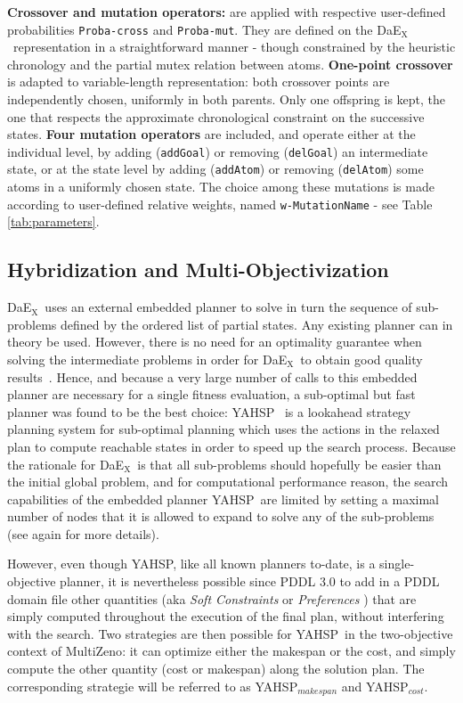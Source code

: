 \documentclass{llncs}
\def\DAEX{{\sc DaE$_{\text{X}}$}}
\def\YAHSP{{\sc YAHSP}}
\def\MULTIZENO{{\sc MultiZeno}}
\renewcommand{\paragraph}[1]{{\bf #1}}
\begin{document}
\paragraph{Crossover and mutation operators:} are applied with respective user-defined probabilities {\tt Proba-cross} and {\tt Proba-mut}. They are defined on the \DAEX\ representation in a straightforward manner - though constrained by the heuristic chronology and the partial mutex relation between atoms.
{\bf One-point crossover} is adapted to variable-length representation: both crossover points are independently chosen, uniformly in both parents. Only one offspring is kept, the one that respects the approximate chronological constraint on the successive states. 
{\bf Four mutation operators} are included, and operate either at the individual level, by adding ({\tt addGoal}) or removing ({\tt delGoal}) an intermediate state, or at the state level by adding ({\tt addAtom}) or removing ({\tt delAtom}) some atoms in a uniformly chosen state. The choice among these mutations is made according to user-defined relative weights, named {\tt w-MutationName} - see Table \ref{tab:parameters}. 


\subsection{Hybridization and Multi-Objectivization}
\label{sec:multiobjectivization}
\DAEX\ uses an external embedded planner to solve in turn the sequence of sub-problems defined by the ordered list of partial states.
Any existing planner can in theory be used. However, there is no need for an optimality guarantee when solving the intermediate problems in order for \DAEX\ to obtain good quality results~\cite{Bibai2010}. Hence, and because a very large number of calls to this embedded planner are necessary for a single fitness evaluation, a sub-optimal but fast planner was found to be the best choice: \YAHSP~\cite{Vidal2004} is a lookahead 
strategy planning system for sub-optimal planning which uses the  actions in the relaxed plan to compute reachable states in order to speed up the search process.
Because the rationale for \DAEX\ is that all sub-problems should hopefully be easier than the initial global problem, and for computational performance reason, the search capabilities of the embedded planner \YAHSP\ are limited by setting a maximal number of nodes that it is allowed to expand to solve any of the sub-problems (see again \cite{Bibai2010} for more details).
 
However, even though \YAHSP, like all known planners to-date, is a single-objective planner, it is nevertheless possible since PDDL 3.0 to add in a PDDL domain file other quantities (aka {\em Soft Constraints} or {\em Preferences} \cite{gerevini2006preferences}) that are simply computed throughout the execution of the final plan, without interfering with the search. Two strategies are then possible for \YAHSP\ in the two-objective context of \MULTIZENO: it can optimize either the makespan or the cost, and simply compute the other quantity (cost or makespan) along the solution plan. The corresponding strategie will be referred to as \YAHSP$_{makespan}$ and \YAHSP$_{cost}$. 
\end{document}
